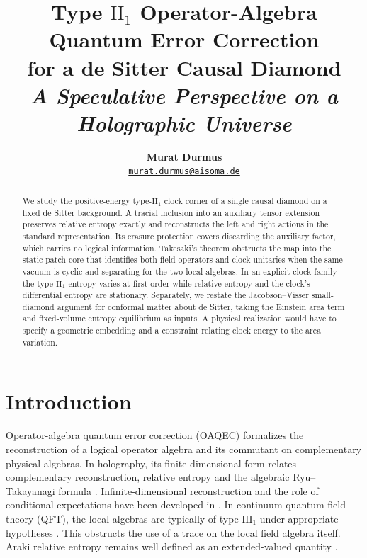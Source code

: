 \documentclass[11pt,a4paper]{article}
\title{Type \texorpdfstring{$\mathrm{II}_1$}{II1} Operator-Algebra Quantum Error Correction\\
       for a de Sitter Causal Diamond\\[0.45em]
       {\large\itshape A Speculative Perspective on a Holographic Universe}}
\author{\textbf{Murat Durmus}\\[0.2em]
        \small \href{mailto:murat.durmus@aisoma.de}{\texttt{murat.durmus@aisoma.de}}}
\date{}
\numberwithin{equation}{section}
\theoremstyle{remark}
\begin{document}
\maketitle

\begin{abstract}
We study the positive-energy type-$\mathrm{II}_1$ clock corner of a single causal diamond on a fixed de Sitter background. A tracial inclusion into an auxiliary tensor extension preserves relative entropy exactly and reconstructs the left and right actions in the standard representation. Its erasure protection covers discarding the auxiliary factor, which carries no logical information. Takesaki's theorem obstructs the map into the static-patch core that identifies both field operators and clock unitaries when the same vacuum is cyclic and separating for the two local algebras. In an explicit clock family the type-$\mathrm{II}_1$ entropy varies at first order while relative entropy and the clock's differential entropy are stationary. Separately, we restate the Jacobson--Visser small-diamond argument for conformal matter about de Sitter, taking the Einstein area term and fixed-volume entropy equilibrium as inputs. A physical realization would have to specify a geometric embedding and a constraint relating clock energy to the area variation.
\end{abstract}

{\setcounter{tocdepth}{2}\tableofcontents}

\section{Introduction}
\label{sec:intro}

Operator-algebra quantum error correction (OAQEC) formalizes the reconstruction of a logical operator algebra and its commutant on complementary physical algebras. In holography, its finite-dimensional form relates complementary reconstruction, relative entropy and the algebraic Ryu--Takayanagi formula \cite{Beny2007a,Almheiri2015,Harlow2017,Jafferis2016}. Infinite-dimensional reconstruction and the role of conditional expectations have been developed in \cite{Kang2019,Faulkner2020}. In continuum quantum field theory (QFT), the local algebras are typically of type $\mathrm{III}_1$ under appropriate hypotheses \cite{Haag1996,Buchholz1987}. This obstructs the use of a trace on the local field algebra itself. Araki relative entropy remains well defined as an extended-valued quantity \cite{Araki1976}.
\end{document}
